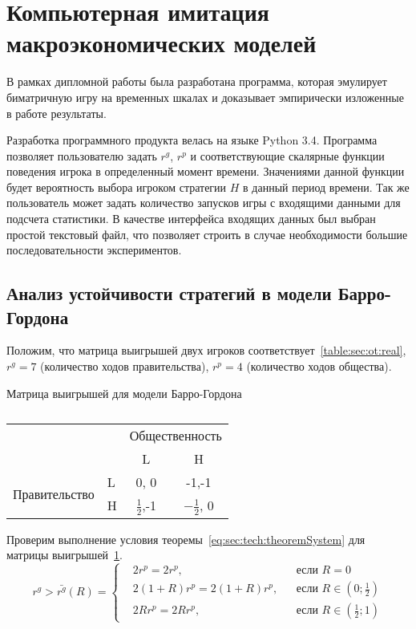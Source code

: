 \section{Компьютерная имитация макроэкономических моделей} 

В рамках дипломной работы была разработана программа, которая эмулирует
биматричную игру на временных шкалах и доказывает эмпирически изложенные в
работе результаты.  

Разработка программного продукта велась на языке Python 3.4.
Программа позволяет пользователю задать $r^g$, $r^p$ и соответствующие
скалярные функции поведения игрока в определенный момент времени. Значениями
данной функции будет вероятность выбора игроком  стратегии $H$ в данный период
времени. Так же пользователь может задать количество запусков игры с входящими
данными для подсчета статистики. В качестве интерфейса входящих данных был
выбран простой текстовый файл, что позволяет строить в случае необходимости 
большие последовательности экспериментов.

\subsection{Анализ устойчивости стратегий в модели Барро-Гордона}
Положим, что матрица выигрышей двух игроков соответствует~\ref{table:sec:ot:real},
$r^g= 7$ (количество ходов правительства), $r^p= 4$ (количество ходов общества).

\begin{table}[h]
	\centering
	
	\caption{}	
			\footnotesize Матрица выигрышей для модели Барро-Гордона\\
			\normalsize
			
\begin{tabular}{|l|l|c|c|}
	\hline
	\multicolumn{2}{|l|}{\multirow{2}{*}{}} & \multicolumn{2}{l|}{Общественность} \\ \cline{3-4} 
	\multicolumn{2}{|l|}{}                  & L                & H                \\ \hline
	\multirow{2}{*}{Правительство}    & L   & 0, 0             & -1,-1            \\ \cline{2-4} 
	& H   & $\frac{1}{2}$,-1             & $-\frac{1}{2}$, 0            \\ \hline
\end{tabular}

	\label{table:sec:ot:real1}
\end{table}

Проверим выполнение условия теоремы~\ref{eq:sec:tech:theoremSystem} для матрицы выигрышей~\ref{table:sec:ot:real1}. 
$$
r^g> \bar{r^g}(R) = \left\{ 
\begin{aligned} 
&2r^p= 2r^p, &&\text{если } R=0
\\
&2(1+R)r^p= 2(1+R)r^p, &&\text{если } 	R\in\left(0; \frac{1}{2}\right)
\\
&2Rr^p= 2Rr^p, &&\text{если } 	R\in\left( \frac{1}{2};1\right)
\end{aligned}
\right.		
$$

